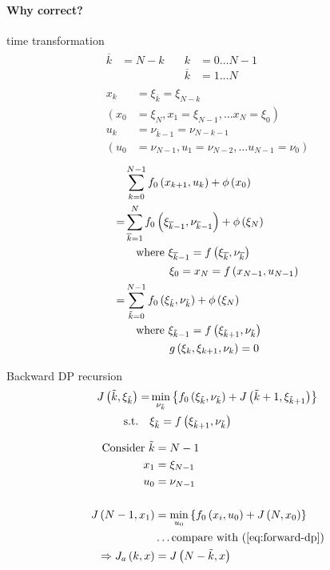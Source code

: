 \paragraph{Why correct?} time transformation
\begin{gather*}
    \begin{alignat*}{3}
        \overline{k} &= N - k \quad & k &= 0 \dots N-1\\
            && \overline{k} &= 1 \dots N
    \end{alignat*}\\
    \begin{align*}
        x_k &= \xi_{\overline{k}} = \xi_{N-k}\\
        \left( x_0 \right. &= \left. \xi_N, x_1 = \xi_{N-1}, \dots x_N = \xi_0 \right)\\
        u_k &= \nu_{\overline{k}-1} = \nu_{N-k-1}\\
        \left( u_0 \right. &= \left. \nu_{N-1}, u_1 = \nu_{N-2}, \dots u_{N-1} = \nu_0 \right)
    \end{align*}
\end{gather*}%
%
\begin{align*}
      & \sum_{k=0}^{N-1}   f_0 \left( x_{k+1},u_k \right) + \phi \left( x_0 \right)\\
    = & \sum_{\overline{k}=1}^{N}   f_0 \left( \xi_{\overline{k}-1},\nu_{\overline{k}-1} \right) + \phi \left( \xi_N \right)\\
    & \quad \textnormal{where } \xi_{\overline{k}-1} = f \left(  \xi_{\overline{k}},\nu_{\overline{k}}  \right)\\
    & \qquad \qquad \xi_0 = x_N = f \left(  x_{N-1}, u_{N-1}  \right)\\
    = & \sum_{\tilde{k}=0}^{N-1}   f_0 \left( \xi_{\tilde{k}},\nu_{\tilde{k}} \right) + \phi \left( \xi_N \right)\\
    & \quad \textnormal{where } \xi_{\tilde{k}-1} = f \left(  \xi_{\tilde{k}+1},\nu_{\tilde{k}}  \right)\\
    & \qquad \qquad g \left(  \xi_k, \xi_{k+1}, \nu_k  \right) = 0
\end{align*}

\begin{optExample}{Backward DP recursion}
    \begin{align*}
        J \left( {\tilde{k}}, \xi_{\tilde{k}} \right) = &\min_{\nu_{\tilde{k}}}  \left\lbrace  f_0 \left( \xi_{\tilde{k}}, \nu_{\tilde{k}} \right) + J\left( {\tilde{k}}+1, \xi_{{\tilde{k}}+1} \right) \right\rbrace\\
        \textnormal{s.t.} \quad &\xi_{\tilde{k}}  = f \left( \xi_{{\tilde{k}}+1}, \nu_{\tilde{k}} \right)
    \end{align*}%
\end{optExample}%
%
\begin{align*}
    \txt{Consider } \ktild &= N-1\\
    x_1 &= \xi_{N-1}\\
    u_0 &= \nu_{N-1}\\
    \\
    J \paren{N-1,x_1} &= \min_{u_0} \set{f_0 \paren{x_i,u_0} + J \paren{N, x_0}}\\
    & \dots \txt{compare with \eqn{eq:forward-dp}}\\
    \Rightarrow J_a\paren{k,x} &= J \paren{N - \ktild, x}
\end{align*}